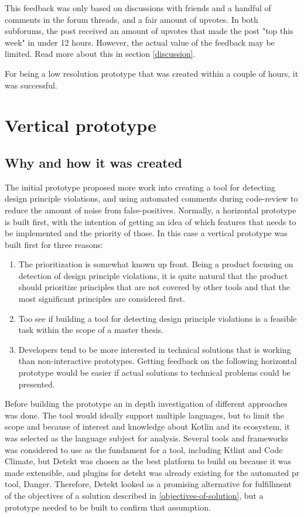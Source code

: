 \documentclass{report}
\begin{document}
This feedback was only based on discussions with friends and a handful of comments in the forum threads, and a fair amount of upvotes. In both subforums, the post received an amount of upvotes that made the post "top this week" in under 12 hours. However, the actual value of the feedback may be limited. Read more about this in section \ref{discussion}. 

For being a low resolution prototype that was created within a couple of hours, it was successful.


\section{Vertical prototype}
\label{vertical-prototype}
\subsection*{Why and how it was created}
The initial prototype proposed more work into creating a tool for detecting design principle violations, and using automated comments during code-review to reduce the amount of noise from false-positives. Normally, a horizontal prototype is built first, with the intention of getting an idea of which features that needs to be implemented and the priority of those. In this case a vertical prototype was built first for three reasons:

\begin{enumerate}
    \item The prioritization is somewhat known up front. Being a product focusing on detection of design principle violations, it is quite natural that the product should prioritize principles that are not covered by other tools and that the most significant principles are considered first.
    \item Too see if building a tool for detecting design principle violations is a feasible task within the scope of a master thesis.
    \item Developers tend to be more interested in technical solutions that is working than non-interactive prototypes. Getting feedback on the following horizontal prototype would be easier if actual solutions to technical problems could be presented.
\end{enumerate}

Before building the prototype an in depth investigation of different approaches was done. The tool would ideally support multiple languages, but to limit the scope and because of interest and knowledge about Kotlin and its ecosystem, it was selected as the language subject for analysis. Several tools and frameworks was considered to use as the fundament for a tool, including Ktlint\cite{ktlint} and Code Climate\cite{codeclimate}, but Detekt\cite{detekt} was chosen as the best platform to build on because it was made extensible, and plugins for detekt was already existing for the automated \gls{pr} tool\cite{danger-detekt-plugin}, Danger\cite{danger}. Therefore, Detekt looked as a promising alternative for fulfillment of the objectives of a solution described in \ref{objectives-of-solution}, but a prototype needed to be built to confirm that assumption. 
\end{document}
